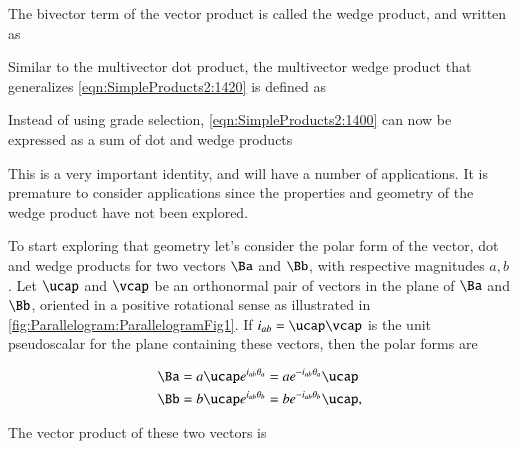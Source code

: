 The bivector term of the vector product is called the wedge product, and written as


Similar to the multivector dot product, the multivector wedge product that generalizes
\cref{eqn:SimpleProducts2:1420} is defined as


Instead of using grade selection, \cref{eqn:SimpleProducts2:1400} can now be expressed as a sum of dot and wedge products


This is a very important identity, and will have a number of applications.
It is premature to consider applications since
the properties and geometry of the wedge product have not been explored.

To start exploring that geometry let's consider the polar form of the vector, dot and wedge products for two vectors \( \Ba \) and \( \Bb \), with respective magnitudes \( a, b \).
Let \( \ucap \) and \( \vcap \) be an orthonormal pair of vectors in the plane of \( \Ba \) and \( \Bb \), oriented in a positive rotational sense as illustrated in
\cref{fig:Parallelogram:ParallelogramFig1}.
If \( i_{ab} = \ucap \vcap \) is the unit pseudoscalar for the plane containing these vectors, then the polar forms are

\begin{dmath}\label{eqn:SimpleProducts2:1660}
\begin{aligned}
\Ba &= a \ucap e^{ i_{ab} \theta_a } = a e^{ -i_{ab} \theta_a } \ucap \\
\Bb &= b \ucap e^{ i_{ab} \theta_b } = b e^{ -i_{ab} \theta_b } \ucap,
\end{aligned}
\end{dmath}

The vector product of these two vectors is

